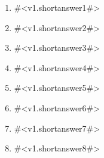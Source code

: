 \begin{enumerate}
\item
#<v1.shortanswer1#>
\item
#<v1.shortanswer2#>
\item
#<v1.shortanswer3#>
\item
#<v1.shortanswer4#>
\item
#<v1.shortanswer5#>
\item
#<v1.shortanswer6#>
\item
#<v1.shortanswer7#>
\item
#<v1.shortanswer8#> 

\end{enumerate}



